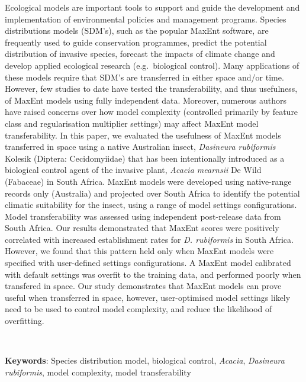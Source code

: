 \documentclass[12pt,]{article}
\begin{document}
Ecological models are important tools to support and guide the
development and implementation of environmental policies and management
programs. Species distributions models (SDM's), such as the popular
MaxEnt software, are frequently used to guide conservation programmes,
predict the potential distribution of invasive species, forecast the
impacts of climate change and develop applied ecological research
(e.g.~biological control). Many applications of these models require
that SDM's are transferred in either space and/or time. However, few
studies to date have tested the transferability, and thus usefulness, of
MaxEnt models using fully independent data. Moreover, numerous authors
have raised concerns over how model complexity (controlled primarily by
feature class and regularisation multiplier settings) may affect MaxEnt
model transferability. In this paper, we evaluated the usefulness of
MaxEnt models transferred in space using a native Australian insect,
\emph{Dasineura rubiformis} Kolesik (Diptera: Cecidomyiidae) that has
been intentionally introduced as a biological control agent of the
invasive plant, \emph{Acacia mearnsii} De Wild (Fabaceae) in South
Africa. MaxEnt models were developed using native-range records only
(Australia) and projected over South Africa to identify the potential
climatic suitability for the insect, using a range of model settings
configurations. Model transferability was assessed using independent
post-release data from South Africa. Our results demonstrated that
MaxEnt scores were positively correlated with increased establishment
rates for \emph{D. rubiformis} in South Africa. However, we found that
this pattern held only when MaxEnt models were specified with
user-defined settings configurations. A MaxEnt model calibrated with
default settings was overfit to the training data, and performed poorly
when transfered in space. Our study demonstrates that MaxEnt models can
prove useful when transferred in space, however, user-optimised model
settings likely need to be used to control model complexity, and reduce
the likelihood of overfitting.

~

\setlength{\parindent}{0in}
\setlength{\leftskip}{0in}
\setlength{\parskip}{8pt}
\vspace*{-0.2in}

\noindent

\textbf{Keywords}: Species distribution model, biological control,
\emph{Acacia}, \emph{Dasineura rubiformis}, model complexity, model
transferability
\end{document}
